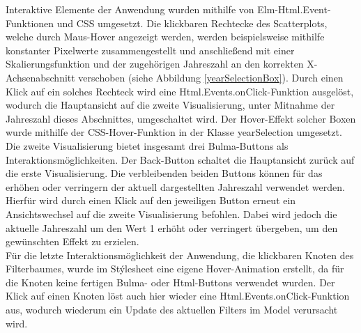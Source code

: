 \documentclass[usegeometry=true]{scrartcl}
\begin{document}
Interaktive Elemente der Anwendung wurden mithilfe von Elm-Html.Event-Funktionen und CSS umgesetzt. Die klickbaren Rechtecke des Scatterplots, welche durch Maus-Hover angezeigt werden, werden beispielsweise mithilfe konstanter Pixelwerte zusammengestellt und anschließend mit einer Skalierungsfunktion und der zugehörigen Jahreszahl an den korrekten X-Achsenabschnitt verschoben (siehe Abbildung \ref{yearSelectionBox}). Durch einen Klick auf ein solches Rechteck wird eine Html.Events.onClick-Funktion ausgelöst, wodurch die Hauptansicht auf die zweite Visualisierung, unter Mitnahme der Jahreszahl dieses Abschnittes, umgeschaltet wird. Der Hover-Effekt solcher Boxen wurde mithilfe der CSS-Hover-Funktion in der Klasse \glqq yearSelection\grqq{} umgesetzt.\\ Die zweite Visualisierung bietet insgesamt drei Bulma-Buttons als Interaktionsmöglichkeiten. Der \glqq Back\grqq-Button schaltet die Hauptansicht zurück auf die erste Visualisierung. Die verbleibenden beiden Buttons können für das erhöhen oder verringern der aktuell dargestellten Jahreszahl verwendet werden. Hierfür wird durch einen Klick auf den jeweiligen Button erneut ein Ansichtswechsel auf die zweite Visualisierung befohlen. Dabei wird jedoch die aktuelle Jahreszahl um den Wert 1 erhöht oder verringert übergeben, um den gewünschten Effekt zu erzielen.\\ Für die letzte Interaktionsmöglichkeit der Anwendung, die klickbaren Knoten des Filterbaumes, wurde im Stýlesheet eine eigene Hover-Animation erstellt, da für die Knoten keine fertigen Bulma- oder Html-Buttons verwendet wurden. Der Klick auf einen Knoten löst auch hier wieder eine Html.Events.onClick-Funktion aus, wodurch wiederum ein Update des aktuellen Filters im Model verursacht wird.\\
\end{document}
